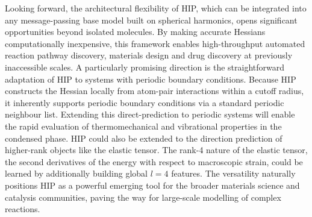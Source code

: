 \documentclass[pdflatex,sn-mathphys-num]{sn-jnl}%
\theoremstyle{thmstyleone}%
\theoremstyle{thmstyletwo}%
\theoremstyle{thmstylethree}%
\begin{document}
Looking forward, the architectural flexibility of HIP, which can be integrated into any message-passing base model built on spherical harmonics, opens significant opportunities beyond isolated molecules. By making accurate Hessians computationally inexpensive, this framework enables high-throughput automated reaction pathway discovery, materials design and drug discovery at previously inaccessible scales. A particularly promising direction is the straightforward adaptation of HIP to systems with periodic boundary conditions. Because HIP constructs the Hessian locally from atom-pair interactions within a cutoff radius, it inherently supports periodic boundary conditions via a standard periodic neighbour list. 
Extending this direct-prediction to periodic systems will enable the rapid evaluation of thermomechanical and vibrational properties in the condensed phase. 
HIP could also be extended to the direction prediction of higher-rank objects like the elastic tensor. The rank-4 nature of the elastic tensor, the second derivatives of the energy with respect to macroscopic strain, could be learned by additionally building global $l=4$ features.
The versatility naturally positions HIP as a powerful emerging tool for the broader materials science and catalysis communities, paving the way for large-scale modelling of complex reactions.
\end{document}
